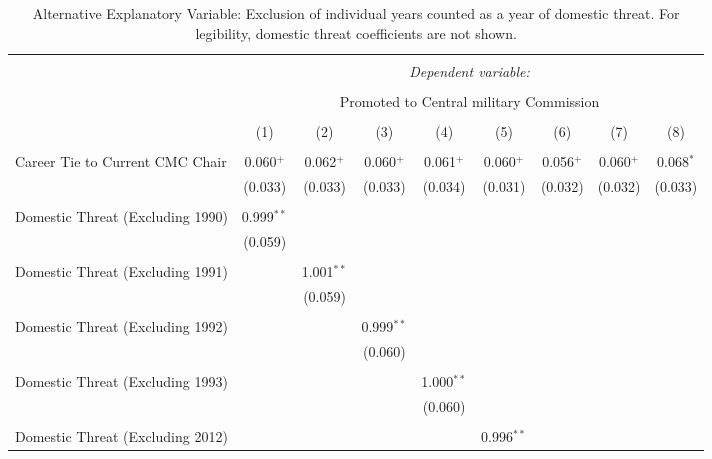 \documentclass[12pt,letterpaper]{article}
\begin{document}
\begin{table}[!htbp] \centering 
	\caption{Alternative Explanatory Variable: Exclusion of individual years counted as a year of domestic threat. For legibility, domestic threat coefficients are not shown.} 
	\label{}
	\rmfamily
	\scriptsize  
	\begin{tabular}{@{\extracolsep{5pt}}lcccccccc} 
		\\[-1.8ex]\hline 
		\hline \\[-1.8ex] 
		& \multicolumn{8}{c}{\textit{Dependent variable:}} \\ 
		\cline{2-9} 
		\\[-1.8ex] & \multicolumn{8}{c}{Promoted to Central military Commission} \\ 
		\\[-1.8ex] & (1) & (2) & (3) & (4) & (5) & (6) & (7) & (8)\\ 
		\hline \\[-1.8ex] 
		Career Tie to Current CMC Chair & 0.060$^{+}$ & 0.062$^{+}$ & 0.060$^{+}$ & 0.061$^{+}$ & 0.060$^{+}$ & 0.056$^{+}$ & 0.060$^{+}$ & 0.068$^{*}$ \\ 
		& (0.033) & (0.033) & (0.033) & (0.034) & (0.031) & (0.032) & (0.032) & (0.033) \\ 
		& & & & & & & & \\ 
		Domestic Threat (Excluding 1990) & 0.999$^{**}$ &  &  &  &  &  &  &  \\ 
		& (0.059) &  &  &  &  &  &  &  \\ 
		& & & & & & & & \\ 
		Domestic Threat (Excluding 1991) &  & 1.001$^{**}$ &  &  &  &  &  &  \\ 
		&  & (0.059) &  &  &  &  &  &  \\ 
		& & & & & & & & \\ 
		Domestic Threat (Excluding 1992) &  &  & 0.999$^{**}$ &  &  &  &  &  \\ 
		&  &  & (0.060) &  &  &  &  &  \\ 
		& & & & & & & & \\ 
		Domestic Threat (Excluding 1993) &  &  &  & 1.000$^{**}$ &  &  &  &  \\ 
		&  &  &  & (0.060) &  &  &  &  \\ 
		& & & & & & & & \\ 
		Domestic Threat (Excluding 2012) &  &  &  &  & 0.996$^{**}$ &  &  &  \\ 

\end{tabular}
\end{table}
\end{document}
